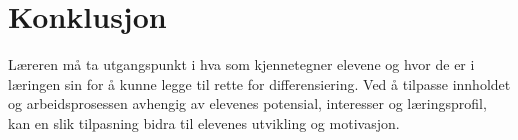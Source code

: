 \documentclass[main.tex]{subfiles}
\begin{document}
\section*{Konklusjon}

Læreren må ta utgangspunkt i hva som kjennetegner elevene og hvor de er i læringen sin for å kunne legge til rette for differensiering.
Ved å tilpasse innholdet og arbeidsprosessen  avhengig av elevenes potensial, interesser og læringsprofil, kan en slik tilpasning bidra til elevenes utvikling og motivasjon.
\end{document}
